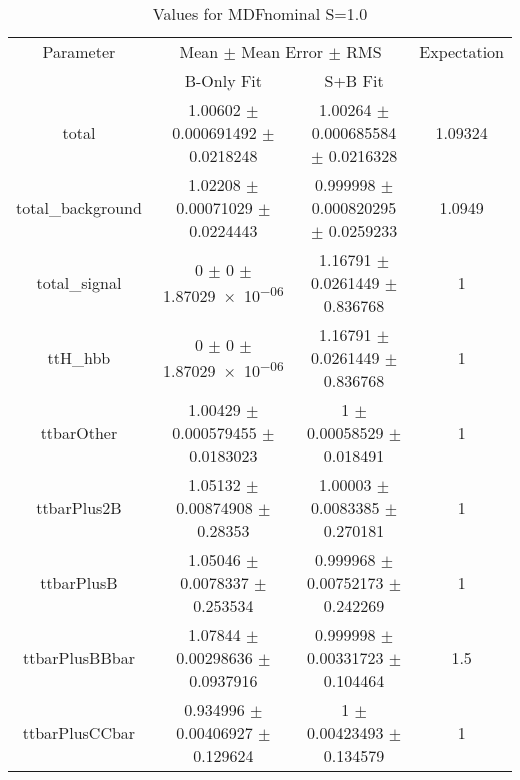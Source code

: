 \begin{table}
\centering
\caption{Values for MDFnominal S=1.0}
\begin{tabular}{cccc}
\toprule
Parameter & \multicolumn{2}{c}{Mean $\pm$ Mean Error $\pm$ RMS} & Expectation\\
 & B-Only Fit & S+B Fit & \\
\midrule
total & \num{1.00602} $\pm$ \num{0.000691492} $\pm$ \num{0.0218248} & \num{1.00264} $\pm$ \num{0.000685584} $\pm$ \num{0.0216328} & \num{1.09324}\\
total\_background & \num{1.02208} $\pm$ \num{0.00071029} $\pm$ \num{0.0224443} & \num{0.999998} $\pm$ \num{0.000820295} $\pm$ \num{0.0259233} & \num{1.0949}\\
total\_signal & \num{0} $\pm$ \num{0} $\pm$ \num{1.87029e-06} & \num{1.16791} $\pm$ \num{0.0261449} $\pm$ \num{0.836768} & \num{1}\\
ttH\_hbb & \num{0} $\pm$ \num{0} $\pm$ \num{1.87029e-06} & \num{1.16791} $\pm$ \num{0.0261449} $\pm$ \num{0.836768} & \num{1}\\
ttbarOther & \num{1.00429} $\pm$ \num{0.000579455} $\pm$ \num{0.0183023} & \num{1} $\pm$ \num{0.00058529} $\pm$ \num{0.018491} & \num{1}\\
ttbarPlus2B & \num{1.05132} $\pm$ \num{0.00874908} $\pm$ \num{0.28353} & \num{1.00003} $\pm$ \num{0.0083385} $\pm$ \num{0.270181} & \num{1}\\
ttbarPlusB & \num{1.05046} $\pm$ \num{0.0078337} $\pm$ \num{0.253534} & \num{0.999968} $\pm$ \num{0.00752173} $\pm$ \num{0.242269} & \num{1}\\
ttbarPlusBBbar & \num{1.07844} $\pm$ \num{0.00298636} $\pm$ \num{0.0937916} & \num{0.999998} $\pm$ \num{0.00331723} $\pm$ \num{0.104464} & \num{1.5}\\
ttbarPlusCCbar & \num{0.934996} $\pm$ \num{0.00406927} $\pm$ \num{0.129624} & \num{1} $\pm$ \num{0.00423493} $\pm$ \num{0.134579} & \num{1}\\
\bottomrule
\end{tabular}
\end{table}